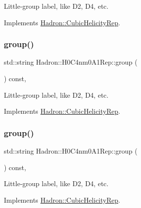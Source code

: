 Little-\/group label, like D2, D4, etc. 

Implements \mbox{\hyperlink{structHadron_1_1CubicHelicityRep_a101a7d76cd8ccdad0f272db44b766113}{Hadron\+::\+Cubic\+Helicity\+Rep}}.

\mbox{\label{structHadron_1_1H0C4nm0A1Rep_a721e8c07bbc6143cad2cf745771be3f9}} 
\subsubsection{\texorpdfstring{group()}{group()}\hspace{0.1cm}{\footnotesize\ttfamily [2/3]}}
{\footnotesize\ttfamily std\+::string Hadron\+::\+H0\+C4nm0\+A1\+Rep\+::group (\begin{DoxyParamCaption}{ }\end{DoxyParamCaption}) const\hspace{0.3cm}{\ttfamily [inline]}, {\ttfamily [virtual]}}

Little-\/group label, like D2, D4, etc. 

Implements \mbox{\hyperlink{structHadron_1_1CubicHelicityRep_a101a7d76cd8ccdad0f272db44b766113}{Hadron\+::\+Cubic\+Helicity\+Rep}}.

\mbox{\label{structHadron_1_1H0C4nm0A1Rep_a721e8c07bbc6143cad2cf745771be3f9}} 
\subsubsection{\texorpdfstring{group()}{group()}\hspace{0.1cm}{\footnotesize\ttfamily [3/3]}}
{\footnotesize\ttfamily std\+::string Hadron\+::\+H0\+C4nm0\+A1\+Rep\+::group (\begin{DoxyParamCaption}{ }\end{DoxyParamCaption}) const\hspace{0.3cm}{\ttfamily [inline]}, {\ttfamily [virtual]}}

Little-\/group label, like D2, D4, etc. 

Implements \mbox{\hyperlink{structHadron_1_1CubicHelicityRep_a101a7d76cd8ccdad0f272db44b766113}{Hadron\+::\+Cubic\+Helicity\+Rep}}.

